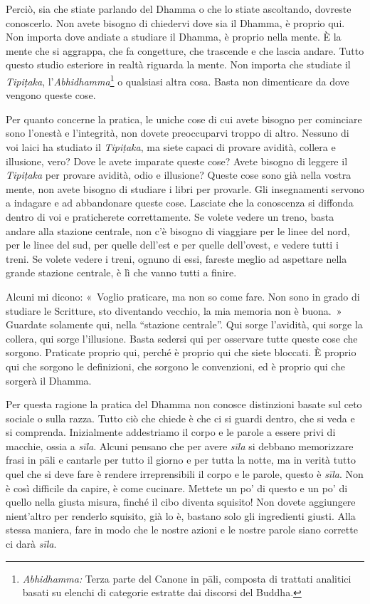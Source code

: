 Perciò, sia che stiate parlando del Dhamma o che lo stiate ascoltando,
dovreste conoscerlo. Non avete bisogno di chiedervi dove sia il Dhamma,
è proprio qui. Non importa dove andiate a studiare il Dhamma, è proprio
nella mente. È la mente che si aggrappa, che fa congetture, che
trascende e che lascia andare. Tutto questo studio esteriore in realtà
riguarda la mente. Non importa che studiate il \emph{Tipiṭaka},
l'\emph{Abhidhamma}\footnote{\emph{Abhidhamma:} Terza parte del Canone
  in pāli, composta di trattati analitici basati su elenchi di categorie
  estratte dai discorsi del Buddha.} o qualsiasi altra cosa. Basta non
dimenticare da dove vengono queste cose.

Per quanto concerne la pratica, le uniche cose di cui avete bisogno per
cominciare sono l'onestà e l'integrità, non dovete preoccuparvi troppo
di altro. Nessuno di voi laici ha studiato il \emph{Tipiṭaka}, ma siete
capaci di provare avidità, collera e illusione, vero? Dove le avete
imparate queste cose? Avete bisogno di leggere il \emph{Tipiṭaka} per
provare avidità, odio e illusione? Queste cose sono già nella vostra
mente, non avete bisogno di studiare i libri per provarle. Gli
insegnamenti servono a indagare e ad abbandonare queste cose. Lasciate
che la conoscenza si diffonda dentro di voi e praticherete
correttamente. Se volete vedere un treno, basta andare alla stazione
centrale, non c'è bisogno di viaggiare per le linee del nord, per le
linee del sud, per quelle dell'est e per quelle dell'ovest, e vedere
tutti i treni. Se volete vedere i treni, ognuno di essi, fareste meglio
ad aspettare nella grande stazione centrale, è lì che vanno tutti a
finire.

Alcuni mi dicono: «~Voglio praticare, ma non so come fare. Non sono in
grado di studiare le Scritture, sto diventando vecchio, la mia memoria
non è buona.~» Guardate solamente qui, nella ``stazione centrale''. Qui
sorge l'avidità, qui sorge la collera, qui sorge l'illusione. Basta
sedersi qui per osservare tutte queste cose che sorgono. Praticate
proprio qui, perché è proprio qui che siete bloccati. È proprio qui che
sorgono le definizioni, che sorgono le convenzioni, ed è proprio qui che
sorgerà il Dhamma.

Per questa ragione la pratica del Dhamma non conosce distinzioni basate
sul ceto sociale o sulla razza. Tutto ciò che chiede è che ci si guardi
dentro, che si veda e si comprenda. Inizialmente addestriamo il corpo e
le parole a essere privi di macchie, ossia a \emph{sīla}. Alcuni pensano
che per avere \emph{sīla} si debbano memorizzare frasi in pāli e
cantarle per tutto il giorno e per tutta la notte, ma in verità tutto
quel che si deve fare è rendere irreprensibili il corpo e le parole,
questo è \emph{sīla}. Non è così difficile da capire, è come cucinare.
Mettete un po' di questo e un po' di quello nella giusta misura, finché
il cibo diventa squisito! Non dovete aggiungere nient'altro per renderlo
squisito, già lo è, bastano solo gli ingredienti giusti. Alla stessa
maniera, fare in modo che le nostre azioni e le nostre parole siano
corrette ci darà \emph{sīla}.

